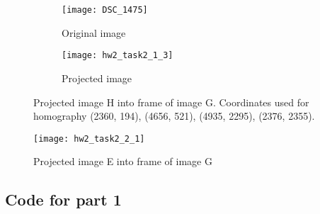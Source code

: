 \documentclass[11pt]{article}
\begin{document}
\begin{figure}[H]
\begin{subfigure}{.5\textwidth}
  \centering
  \texttt{[image: DSC\_1475]}
  \caption{Original image}
  \label{}
\end{subfigure}
\begin{subfigure}{.5\textwidth}
  \centering
  \texttt{[image: hw2\_task2\_1\_3]}
  \caption{Projected image}
  \label{}
\end{subfigure}
\caption{Projected image H into frame of image G. Coordinates used for homography (2360, 194), (4656, 521), (4935, 2295), (2376, 2355).}
\end{figure}

\begin{figure}[H]
\centering
\texttt{[image: hw2\_task2\_2\_1]}
\caption{Projected image E into frame of image G}
\label{}
\end{figure}


\subsection*{Code for part 1}
\end{document}
